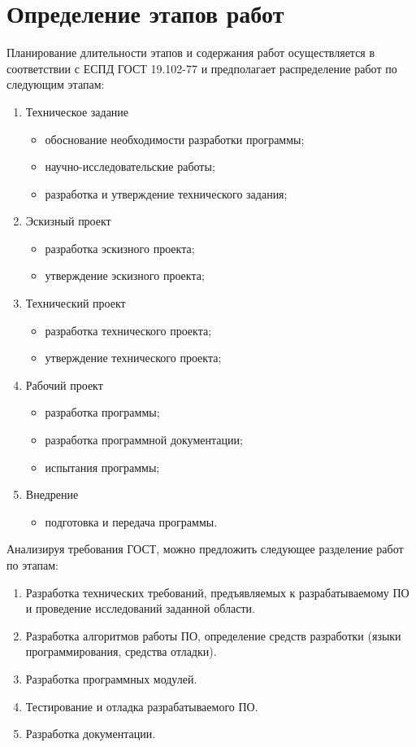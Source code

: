 \section{Определение этапов работ}
Планирование длительности этапов и содержания работ осуществляется в
соответствии с ЕСПД ГОСТ 19.102-77 и предполагает распределение работ по
следующим этапам:
\begin{enumerate}
\item Техническое задание
	\begin{itemize}
	\item обоснование необходимости разработки программы;
	\item научно-исследовательские работы;
	\item разработка и утверждение технического задания;
	\end{itemize}
\item Эскизный проект
	\begin{itemize}
	\item разработка эскизного проекта;
	\item утверждение эскизного проекта;
	\end{itemize}
\item Технический проект
	\begin{itemize}
	\item разработка технического проекта;
	\item утверждение технического проекта;
	\end{itemize}
\item Рабочий проект
	\begin{itemize}
	\item разработка программы;
	\item разработка программной документации;
	\item испытания программы;
	\end{itemize}
\item Внедрение
	\begin{itemize}
	\item подготовка и передача программы.
	\end{itemize}
\end{enumerate}

Анализируя требования ГОСТ, можно предложить следующее разделение работ по
этапам:
\begin{enumerate}
\item Разработка технических требований, предъявляемых к разрабатываемому ПО и
проведение исследований заданной области.
\item Разработка алгоритмов работы ПО, определение средств разработки (языки
		программирования, средства отладки).
\item Разработка программных модулей.
\item Тестирование и отладка разрабатываемого ПО.
\item Разработка документации.
\end{enumerate}

